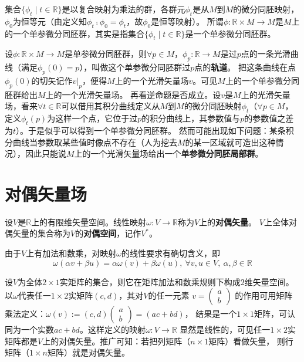 \begin{note}
集合$\{\phi_t \mid t \in \mathbb{R}\}$是以复合映射为乘法的群，各群元$\phi_t$是从$M$到$M$的微分同胚映射，$\phi_0$为恒等元（由定义知$\phi_t \comp \phi_0 = \phi_t$，故$\phi_0$是恒等映射）。
所谓$\phi \colon \mathbb{R} \times M \to M$是$M$上的一个单参微分同胚群，其实是指集合$\{\phi_t \mid t \in \mathbb{R}\}$是一个单参微分同胚群。
\end{note}

设$\phi \colon \mathbb{R} \times M \to M$是单参微分同胚群，则$\forall p \in M$，$\phi_p \colon \mathbb{R} \to M$是过$p$点的一条光滑曲线（满足$\phi_p(0) = p$），叫做这个单参微分同胚群过$p$点的\textbf{轨道}。
把这条曲线在点$\phi_p(0)$的切矢记作$v|_p$，便得$M$上的一个光滑矢量场$v$。可见$M$上的一个单参微分同胚群给出$M$上的一个光滑矢量场。
再看逆命题是否成立。设$v$是$M$上的光滑矢量场，看来$\forall t \in \mathbb{R}$可以借用其积分曲线定义从$M$到$M$的微分同胚映射$\phi_t$（$\forall p \in M$，定义$\phi_t(p)$为这样一个点，它位于过$p$的积分曲线上，其参数值与$p$的参数值之差为$t$）。于是似乎可以得到一个单参微分同胚群。
然而可能出现如下问题：某条积分曲线当参数取某些值时像点不存在（人为挖去$M$的某一区域就可造出这种情况），因此只能说$M$上的一个光滑矢量场给出一个\textbf{单参微分同胚局部群}。

\section{对偶矢量场}

\begin{definition}
设$V$是$\mathbb{R}$上的有限维矢量空间。线性映射$\omega \colon V \to \mathbb{R}$称为$V$上的\textbf{对偶矢量}。
$V$上全体对偶矢量的集合称为$V$的\textbf{对偶空间}，记作$V^*$。
\end{definition}

\begin{note}
由于$V$上有加法和数乘，对映射$\omega$的线性要求有确切含义，即
$$\omega(\alpha v + \beta u) = \alpha\omega(v) + \beta\omega(u), ~ \forall v, u \in V, ~ \alpha, \beta \in \mathbb{R}$$
\end{note}

\begin{example}
设$V$为全体$2 \times 1$实矩阵的集合，则它在矩阵加法和数乘规则下构成$2$维矢量空间。
以$\omega$代表任一$1 \times 2$实矩阵$(c, d)$，其对$V$的任一元素
$v = \begin{pmatrix}a \\ b\end{pmatrix}$
的作用可用矩阵乘法定义：$\omega(v) := (c, d)\begin{pmatrix}a \\ b\end{pmatrix} = (ac + bd)$，
结果是一个$1 \times 1$矩阵，可认同为一个实数$ac + bd$。这样定义的映射$\omega \colon V \to \mathbb{R}$
显然是线性的，可见任一$1 \times 2$实矩阵都是$V$上的对偶矢量。推广可知：若把列矩阵（$n \times 1$矩阵）看做矢量，
则行矩阵（$1 \times n$矩阵）就是对偶矢量。
\end{example}

